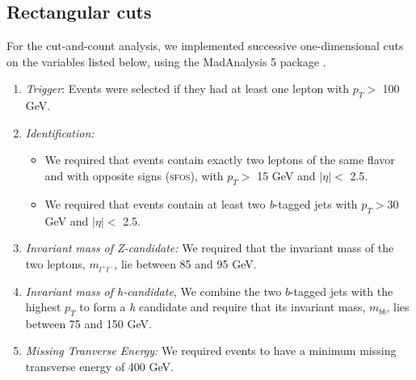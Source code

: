 \subsection{Rectangular cuts}\label{event-selection}

For the cut-and-count analysis, we implemented successive one-dimensional cuts on the variables listed below, using the MadAnalysis 5 package \cite{Madanalysis}.

\begin{enumerate}
\item \emph{Trigger}: Events were selected if they had at least one lepton with $p_{T} >$ 100 GeV. 
\item \emph{Identification:}
  \begin{itemize}
  \item We required that events contain exactly two leptons of the same flavor and with opposite signs (\textsc{sfos}), with $p_{T} >$ 15 GeV and $\vert\eta\vert <$ 2.5.
  \item We required that events contain at least two \emph{b}-tagged jets with $p_{T} > 30$ GeV and $\vert\eta\vert <$ 2.5.
  \end{itemize}
\item \emph{Invariant mass of Z-candidate:} We required that the invariant mass of the two leptons, $m_{l^{+}l^{-}}$, lie between 85 and 95 GeV.
\item \emph{Invariant mass of h-candidate}, We combine the two $b$-tagged jets with the highest $p_{T}$ to form a \emph{h} candidate and require that its invariant mass, $m_{bb}$, lies between 75 and 150 GeV.
\item \emph{Missing Tranverse Energy:} We required events to have a minimum missing transverse energy of 400 GeV.


\end{enumerate}
